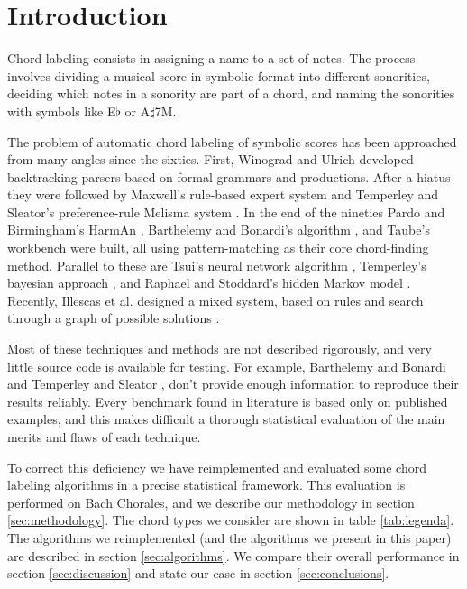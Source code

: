 \section{Introduction}
\label{sec:introduction}

Chord labeling consists in assigning a name to a set of notes. The
process involves dividing a musical score in symbolic format into
different sonorities, deciding which notes in a sonority are part of a
chord, and naming the sonorities with symbols like E$\flat$ or
A$\sharp$7M.

The problem of automatic chord labeling of symbolic scores has been
approached from many angles since the sixties. First, Winograd
\cite{winograd68:linguistics} and Ulrich \cite{ulrich77:analysis}
developed backtracking parsers based on formal grammars and
productions. After a hiatus they were followed by Maxwell's
\cite{maxwell92:expert} rule-based expert system and Temperley and
Sleator's preference-rule Melisma system
\cite{temperley.ea99:modeling}. In the end of the nineties Pardo and
Birmingham's HarmAn \cite{pardo.ea02:algorithms}, Barthelemy and
Bonardi's algorithm \cite{barthelemy.ea01:figured}, and Taube's
workbench \cite{taube99:automatic} were built, all using
pattern-matching as their core chord-finding method. Parallel to these
are Tsui's neural network algorithm \cite{tsui02:harmonic},
Temperley's bayesian approach \cite{temperley04:bayesian}, and Raphael
and Stoddard's hidden Markov model \cite{raphael.ea03:harmonic}.
Recently, Illescas et al. designed a mixed system, based on rules and
search through a graph of possible solutions
\cite{illescas.ea07:harmonic}.

Most of these techniques and methods are not described rigorously, and
very little source code is available for testing. For example,
Barthelemy and Bonardi \cite{pardo.ea02:algorithms} and Temperley and
Sleator \cite{temperley.ea99:modeling}, don't provide enough
information to reproduce their results reliably. Every benchmark found
in literature
\cite{pardo.ea00:automated,pardo.ea02:algorithms,tsui02:harmonic,taube99:automatic,illescas.ea07:harmonic}
is based only on published examples, and this makes difficult a
thorough statistical evaluation of the main merits and flaws of each
technique.

To correct this deficiency we have reimplemented and evaluated some
chord labeling algorithms in a precise statistical framework. This
evaluation is performed on Bach Chorales, and we describe our
methodology in section \ref{sec:methodology}. The chord types we
consider are shown in table \ref{tab:legenda}. The algorithms we
reimplemented (and the algorithms we present in this paper) are
described in section \ref{sec:algorithms}. We compare their overall
performance in section \ref{sec:discussion} and state our case in
section \ref{sec:conclusions}.

